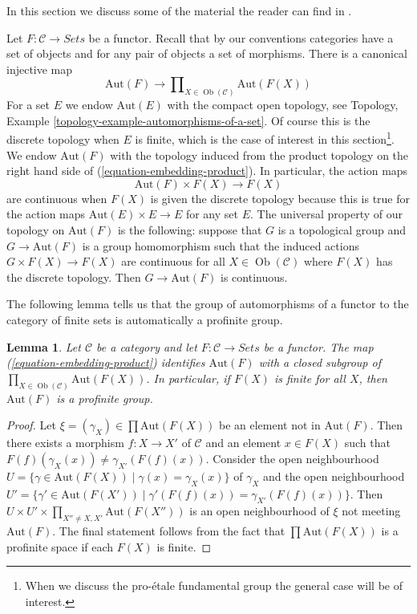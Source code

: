 \documentclass{stacks-project}
\theoremstyle{plain}
\newtheorem{lemma}[subsection]{Lemma}
\theoremstyle{definition}
\theoremstyle{remark}
\numberwithin{equation}{subsection}
\def\Ob{\mathop{\mathrm{Ob}}\nolimits}
\begin{document}
\noindent
In this section we discuss some of the material the reader can
find in \cite[Expos\'e V, Sections 4, 5, and 6]{SGA1}.

\medskip\noindent
Let $F : \mathcal{C} \to \textit{Sets}$ be a functor.
Recall that by our conventions categories have a set of objects and
for any pair of objects a set of morphisms. There is a canonical
injective map
\begin{equation}
\label{equation-embedding-product}
\text{Aut}(F)
\longrightarrow
\prod\nolimits_{X \in \Ob(\mathcal{C})} \text{Aut}(F(X))
\end{equation}
For a set $E$ we endow $\text{Aut}(E)$ with the compact open topology, see
Topology, Example \ref{topology-example-automorphisms-of-a-set}.
Of course this is the discrete topology when $E$ is finite, which
is the case of interest in this section\footnote{When we discuss the
pro-\'etale fundamental group the general case will be of interest.}.
We endow $\text{Aut}(F)$ with the topology induced from the
product topology on the right hand side of (\ref{equation-embedding-product}).
In particular, the action maps
$$
\text{Aut}(F) \times F(X) \longrightarrow F(X)
$$
are continuous when $F(X)$ is given the discrete topology because this
is true for the action maps $\text{Aut}(E) \times E \to E$ for any set $E$.
The universal property of our topology on $\text{Aut}(F)$ is the following:
suppose that $G$ is a topological group and $G \to \text{Aut}(F)$
is a group homomorphism such that the induced actions $G \times F(X) \to F(X)$
are continuous for all $X \in \Ob(\mathcal{C})$ where $F(X)$ has
the discrete topology. Then $G \to \text{Aut}(F)$ is continuous.

\medskip\noindent
The following lemma tells us that the group of automorphisms of a functor
to the category of finite sets is automatically a profinite group.

\begin{lemma}
\label{lemma-aut-inverse-limit}
Let $\mathcal{C}$ be a category and let $F : \mathcal{C} \to \textit{Sets}$
be a functor. The map (\ref{equation-embedding-product}) identifies
$\text{Aut}(F)$ with a closed subgroup of
$\prod_{X \in \Ob(\mathcal{C})} \text{Aut}(F(X))$.
In particular, if $F(X)$ is finite for all $X$, then
$\text{Aut}(F)$ is a profinite group.
\end{lemma}

\begin{proof}
Let $\xi = (\gamma_X) \in \prod \text{Aut}(F(X))$ be an element not in
$\text{Aut}(F)$. Then there exists a morphism $f : X \to X'$ of $\mathcal{C}$
and an element $x \in F(X)$ such that
$F(f)(\gamma_X(x)) \not = \gamma_{X'}(F(f)(x))$.
Consider the open neighbourhood
$U = \{\gamma \in \text{Aut}(F(X)) \mid \gamma(x) = \gamma_X(x)\}$
of $\gamma_X$ and the open neighbourhood
$U' = \{\gamma' \in \text{Aut}(F(X')) \mid \gamma'(F(f)(x)) =
\gamma_{X'}(F(f)(x))\}$.
Then
$U \times U' \times \prod_{X'' \not = X, X'} \text{Aut}(F(X''))$
is an open neighbourhood of $\xi$ not meeting $\text{Aut}(F)$.
The final statement follows from the fact that
$\prod \text{Aut}(F(X))$ is a profinite space if each $F(X)$ is finite.
\end{proof}
\end{document}
